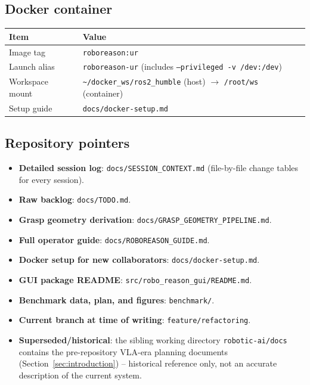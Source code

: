 \subsection{Docker container}

\begin{center}
\begin{tabular}{@{}ll@{}}
\toprule
\textbf{Item} & \textbf{Value} \\
\midrule
Image tag & \texttt{roboreason:ur} \\
Launch alias & \texttt{roboreason-ur} (includes \texttt{--privileged -v /dev:/dev}) \\
Workspace mount & \texttt{\textasciitilde/docker\_ws/ros2\_humble} (host) $\to$ \texttt{/root/ws} (container) \\
Setup guide & \texttt{docs/docker-setup.md} \\
\bottomrule
\end{tabular}
\end{center}

\subsection{Repository pointers}

\begin{itemize}[nosep]
  \item \textbf{Detailed session log}: \texttt{docs/SESSION\_CONTEXT.md}
    (file-by-file change tables for every session).
  \item \textbf{Raw backlog}: \texttt{docs/TODO.md}.
  \item \textbf{Grasp geometry derivation}: \texttt{docs/GRASP\_GEOMETRY\_PIPELINE.md}.
  \item \textbf{Full operator guide}: \texttt{docs/ROBOREASON\_GUIDE.md}.
  \item \textbf{Docker setup for new collaborators}: \texttt{docs/docker-setup.md}.
  \item \textbf{GUI package README}: \texttt{src/robo\_reason\_gui/README.md}.
  \item \textbf{Benchmark data, plan, and figures}: \texttt{benchmark/}.
  \item \textbf{Current branch at time of writing}: \texttt{feature/refactoring}.
  \item \textbf{Superseded/historical}: the sibling working directory
    \texttt{robotic-ai/docs} contains the pre-repository VLA-era planning
    documents (Section~\ref{sec:introduction}) -- historical reference only,
    not an accurate description of the current system.
\end{itemize}
